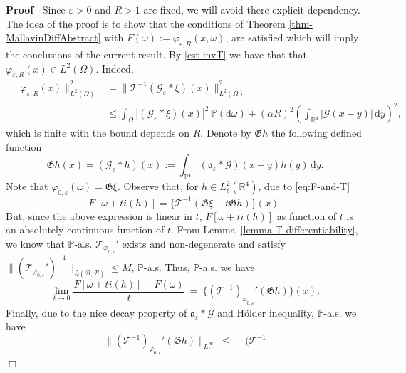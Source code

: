 \documentclass{article}
\newcommand{\assign}{:=}
\newcommand{\mathd}{\mathrm{d}}
\newenvironment{proof}{\noindent\textbf{Proof\ }}{\hspace*{\fill}$\Box$\medskip}
\begin{document}
\begin{proof}
  Since $\varepsilon > 0$ and $R > 1$ are fixed, we will avoid there explicit
  dependency. The idea of the proof is to show that the conditions of Theorem
  \ref{thm-MallavinDiffAbstract} with $F (\omega) \assign
  \varphi_{\varepsilon, R} (x, \omega)$, are satisfied which will imply the
  conclusions of the current result. By \eqref{est-invT} we have that that
  $\varphi_{\varepsilon, R} (x) \in L^2 (\Omega)$. Indeed,
  \begin{align*}
    \| \varphi_{\varepsilon, R} (x) \|_{L^2  (\Omega)}^2 & =  \|
       \mathcal{T}^{- 1} (\mathcal{G}_{\varepsilon} \ast \xi) (x) \|_{L^2 (\Omega)}^2 \\
       & \leq \int_{\Omega} | (\mathcal{G}_{\varepsilon} \ast \xi) (x)
       |^2 \, \mathbb{P} (\mathd \omega) + (\alpha R)^2 \left(
       \int_{\mathbb{R}^4} | \mathcal{G} (x - y) | \, \mathd y \right)^2,   
  \end{align*}
  which is finite with the bound depends on $R$. Denote by $\mathfrak{G}h$ the
  following defined function
  \[ 
       \mathfrak{G}h (x) = (\mathcal{G}_{\varepsilon} \ast h) (x) \assign
       \int_{\mathbb{R}^4} (\mathfrak{a}_{\varepsilon} \ast \mathcal{G}) (x -
       y) h (y)\,  \mathd y.
     \]
  Note that $\varphi_{0, \varepsilon} (\omega) =\mathfrak{G} \xi$. Observe that, for $h \in L^2_{\ell} (\mathbb{R}^4)$, due to \eqref{eq:F-and-T}
  \begin{equation}
      F [\omega + t i (h)] = \{ \mathcal{T}^{- 1} (\mathfrak{G} \xi +
      t\mathfrak{G}h) \} (x) .
    \label{rel-F-T-inverse}
  \end{equation}
  But, since the above expression is linear in $t$, $F [\omega + t i (h)]$ as   function of $t$ is an absolutely continuous function of $t$. From   Lemma~\ref{lemma-T-differentiability}, we know that $\mathbb{P}$-a.s. $\mathcal{T}_{\varphi_{0, \varepsilon}}'$ exists and non-degenerate and   satisfy $\| (\mathcal{T}_{\varphi_{0, \varepsilon}}')^{- 1} \|_{\mathfrak{L}
  (\mathcal{B}, \mathcal{B})} \leqslant M$, $\mathbb{P}$-a.s. Thus,
  $\mathbb{P}$-a.s. we have
  \[ 
       \lim_{t \rightarrow 0} \frac{F [\omega + t i (h)] - F (\omega)}{t}  ~=~
        \{ (\mathcal{T}^{- 1} )_{\varphi_{0, \varepsilon}}' (\mathfrak{G}h)
       \} (x) .
      \]
  Finally, due to the nice decay property of $\mathfrak{a}_{\varepsilon} \ast
  \mathcal{G}$ and H{\"o}lder inequality, $\mathbb{P}$-a.s. we have
  \[ 
       \| (\mathcal{T}^{- 1} )_{\varphi_{0, \varepsilon}}' (\mathfrak{G}h)
       \|_{L_{\ell}^{\infty}}  ~\leq~  \| (\mathcal{T}^{- 1}
\]
\end{proof}
\end{document}
